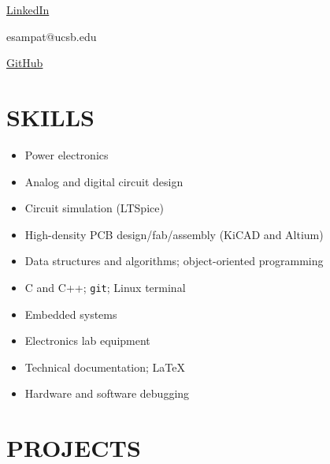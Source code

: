 

	\maketitle
	\begin{center}
		\begin{minipage}{0.33\textwidth}
			\href{https://www.linkedin.com/in/erk-sampat-500331245/}{LinkedIn}
		\end{minipage}%
		\begin{minipage}{0.33\textwidth}
			\centering
			esampat@ucsb.edu
		\end{minipage}%
		\begin{minipage}{0.33\textwidth}
			\raggedleft\href{https://github.com/SAR-mango}{GitHub}
		\end{minipage}
	\end{center}
	\section*{SKILLS}
	\begin{minipage}{0.6\textwidth}
		\begin{itemize}[itemsep=0em]
			\item Power electronics
			\item Analog and digital circuit design
			\item Circuit simulation (LTSpice)
			\item High-density PCB design/fab/assembly (KiCAD and Altium)
			\item Data structures and algorithms; object-oriented programming
		\end{itemize}
	\end{minipage}%
	\begin{minipage}{0.4\textwidth}
		\begin{itemize}[itemsep=0em]
			\item C and C++; \texttt{git}; Linux terminal
			\item Embedded systems
			\item Electronics lab equipment
			\item Technical documentation; \LaTeX
			\item Hardware and software debugging
		\end{itemize}
	\end{minipage}
	\section*{PROJECTS}
